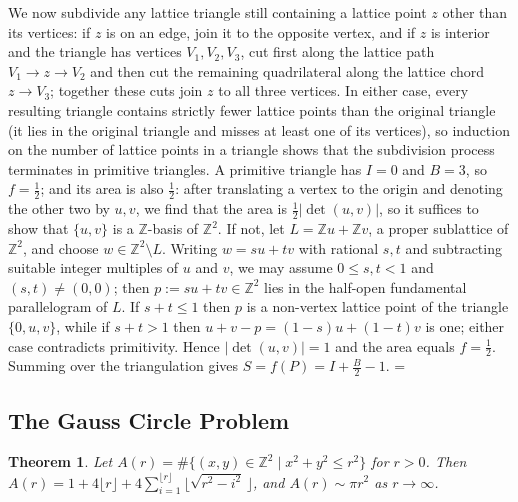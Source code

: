 \documentclass[11pt]{article}
\makeatletter
\let\nt@closedisplay\]
\def\nt@guardedclose{\@ifnextchar\par{\nt@closeafterpar}{\@ifnextchar\end{\postdisplaypenalty\@M\nt@closedisplay}{\nt@closedisplay}}}
\def\nt@closeafterpar\par{\@ifnextchar\par{\nt@closeafterpar}{\@ifnextchar\end{\postdisplaypenalty\@M\nt@closedisplay\par}{\nt@closedisplay\par}}}
\renewenvironment{proof}[1][\proofname]{\par
  \pushQED{\qed}\normalfont\topsep\medskipamount\edef\nt@afterproof{\@endparpenalty=\the\@endparpenalty\relax}\@beginparpenalty\@M\@endparpenalty\@M\let\]\nt@guardedclose\trivlist\item[]\textit{#1\@addpunct{.}} \ignorespaces}{\ifvmode\addpenalty\@M\fi\popQED\nt@afterproof\endtrivlist\@endpefalse}
\theoremstyle{ntstyle}
\newtheorem{theorem}{Theorem}[subsection]
\makeatother
\begin{document}
\begin{proof}
  We now subdivide any lattice triangle still containing a lattice point
  $z$ other than its vertices: if $z$ is on an edge, join it to the opposite
  vertex, and if $z$ is interior and the triangle has vertices
  $V_1,V_2,V_3$, cut first along the lattice path
  $V_1 \to z \to V_2$ and then cut the remaining quadrilateral along the lattice
  chord $z \to V_3$; together these cuts join $z$ to all three vertices. In
  either case, every resulting triangle contains strictly fewer lattice
  points than the original triangle (it lies in the original triangle and misses at least one of its vertices), so
  induction on the number of lattice
  points in a triangle shows that the subdivision process terminates in primitive
  triangles. A primitive triangle has $I = 0$ and $B = 3$, so $f = \tfrac{1}{2}$; and its area is also
  $\tfrac{1}{2}$: after translating a vertex to
  the origin and denoting the other two by $u,v$, we find that the area is
  $\tfrac{1}{2}|\det(u,v)|$, so it suffices to show that $\{u,v\}$ is a
  $\mathbb{Z}$-basis of $\mathbb{Z}^2$. If not, let
  $L=\mathbb{Z}u+\mathbb{Z}v$, a proper sublattice of $\mathbb{Z}^2$, and
  choose $w\in\mathbb{Z}^2\setminus L$. Writing $w=su+tv$ with rational
  $s,t$ and subtracting suitable integer multiples of $u$ and $v$, we
  may assume $0\le s,t<1$ and $(s,t)\neq(0,0)$; then
  $p:=su+tv\in\mathbb{Z}^2$ lies in the half-open fundamental
  parallelogram of $L$. If $s+t\le1$ then $p$ is a non-vertex lattice
  point of the triangle $\{0,u,v\}$, while if $s+t>1$ then
  $u+v-p=(1-s)u+(1-t)v$ is one; either case contradicts
  primitivity. Hence $|\det(u,v)|=1$ and the area equals $f=\tfrac{1}{2}$.
  Summing over the triangulation gives $S = f(P) = I + \tfrac{B}{2} - 1$.
\end{proof}
\subsection{The Gauss Circle Problem}

\begin{theorem}\label{thm:10.9.1}
  Let $A(r) = \#\{(x,y)\in\mathbb{Z}^2 \mid x^2 + y^2 \le r^2\}$ for $r>0$. Then
  $A(r) = 1 + 4\lfloor r\rfloor + 4\sum_{i=1}^{\lfloor r\rfloor}\big\lfloor \sqrt{r^2 - i^2}\,\big\rfloor$, and
  $A(r) \sim \pi r^2$ as $r\to\infty$.

\end{theorem}
\end{document}
